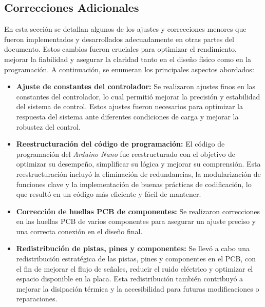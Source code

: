 \subsection{Correcciones Adicionales}
En esta sección se detallan algunos de los ajustes y correcciones menores que fueron implementados y desarrollados adecuadamente en otras partes del documento. Estos cambios fueron cruciales para optimizar el rendimiento, mejorar la fiabilidad y asegurar la claridad tanto en el diseño físico como en la programación. A continuación, se enumeran los principales aspectos abordados:
\begin{itemize}
    \item \textbf{Ajuste de constantes del controlador:} Se realizaron ajustes finos en las constantes del controlador, lo cual permitió mejorar la precisión y estabilidad del sistema de control. Estos ajustes fueron necesarios para optimizar la respuesta del sistema ante diferentes condiciones de carga y mejorar la robustez del control.
    \item \textbf{Reestructuración del código de programación:} El código de programación del \textit{Arduino Nano} fue reestructurado con el objetivo de optimizar su desempeño, simplificar su lógica y mejorar su comprensión. Esta reestructuración incluyó la eliminación de redundancias, la modularización de funciones clave y la implementación de buenas prácticas de codificación, lo que resultó en un código más eficiente y fácil de mantener.
    \item \textbf{Corrección de huellas PCB de componentes:} Se realizaron correcciones en las huellas PCB de varios componentes para asegurar un ajuste preciso y una correcta conexión en el diseño final. 
    \item \textbf{Redistribución de pistas, pines y componentes:} Se llevó a cabo una redistribución estratégica de las pistas, pines y componentes en el PCB, con el fin de mejorar el flujo de señales, reducir el ruido eléctrico y optimizar el espacio disponible en la placa. Esta redistribución también contribuyó a mejorar la disipación térmica y la accesibilidad para futuras modificaciones o reparaciones.
\end{itemize}

